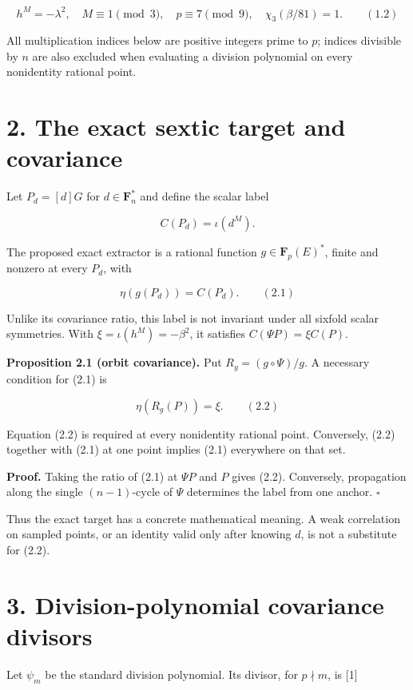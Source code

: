 \documentclass[
  11pt,
  a4paper,
]{article}
\begin{document}
\[
h^M=-\lambda^2,\quad M\equiv1\pmod3,\quad p\equiv7\pmod9,\quad
\chi_3(\beta/81)=1. \qquad (1.2)
\]

All multiplication indices below are positive integers prime to \(p\);
indices divisible by \(n\) are also excluded when evaluating a division
polynomial on every nonidentity rational point.

\section{2. The exact sextic target and
covariance}\label{the-exact-sextic-target-and-covariance}

Let \(P_d=[d]G\) for \(d\in\mathbf F_n^*\) and define the scalar label

\[
C(P_d)=\iota(d^M).
\]

The proposed exact extractor is a rational function
\(g\in\mathbf F_p(E)^*\), finite and nonzero at every \(P_d\), with

\[
\eta(g(P_d))=C(P_d). \qquad (2.1)
\]

Unlike its covariance ratio, this label is not invariant under all
sixfold scalar symmetries. With \(\xi=\iota(h^M)=-\beta^2\), it
satisfies \(C(\Psi P)=\xi C(P)\).

\textbf{Proposition 2.1 (orbit covariance).} Put \(R_g=(g\circ\Psi)/g\).
A necessary condition for (2.1) is

\[
\eta(R_g(P))=\xi. \qquad (2.2)
\]

Equation (2.2) is required at every nonidentity rational point.
Conversely, (2.2) together with (2.1) at one point implies (2.1)
everywhere on that set.

\textbf{Proof.} Taking the ratio of (2.1) at \(\Psi P\) and \(P\) gives
(2.2). Conversely, propagation along the single \((n-1)\)-cycle of
\(\Psi\) determines the label from one anchor. \(\square\)

Thus the exact target has a concrete mathematical meaning. A weak
correlation on sampled points, or an identity valid only after knowing
\(d\), is not a substitute for (2.2).

\section{3. Division-polynomial covariance
divisors}\label{division-polynomial-covariance-divisors}

Let \(\psi_m\) be the standard division polynomial. Its divisor, for
\(p\nmid m\), is {[}1{]}
\end{document}
